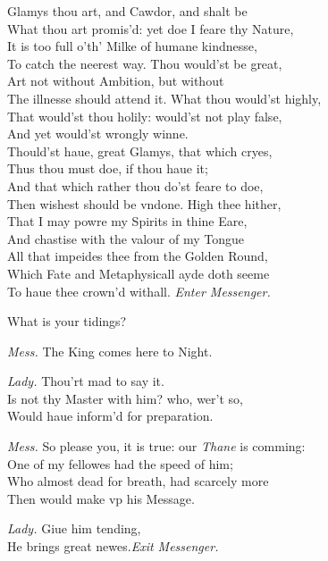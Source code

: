 \documentclass[12pt]{sides}
\newcommand{\clStageDir}[1]{\hspace*{\fill}\textit{#1}\hspace*{\fill}}
\newcommand{\dia}[1]{\hskip 15pt\textit{#1}\hskip 6pt}
\begin{document}
\begin{multicols}{2}
            Glamys thou art, and Cawdor, and shalt be \\ What thou art promis'd: yet doe I feare thy Nature, \\ It is too full o'th' Milke of humane kindnesse, \\ To catch the neerest way. Thou would'st be great, \\ Art not without Ambition, but without \\ The illnesse should attend it. What thou would'st highly, \\ That would'st thou holily: would'st not play false, \\ And yet would'st wrongly winne. \\ Thould'st haue, great Glamys, that which cryes, \\ Thus thou must doe, if thou haue it; \\ And that which rather thou do'st feare to doe, \\ Then wishest should be vndone. High thee hither, \\ That I may powre my Spirits in thine Eare, \\ And chastise with the valour of my Tongue \\ All that impeides thee from the Golden Round, \\ Which Fate and Metaphysicall ayde doth seeme \\ To haue thee crown'd withall. \clStageDir{Enter Messenger.}

            What is your tidings?

            \dia{Mess.} The King comes here to Night.

            \dia{Lady.} Thou'rt mad to say it. \\ Is not thy Master with him? who, wer't so, \\ Would haue inform'd for preparation.

            \dia{Mess.} So please you, it is true: our \textit{Thane} is comming: \\ One of my fellowes had the speed of him; \\ Who almost dead for breath, had scarcely more \\ Then would make vp his Message.

            \dia{Lady.} Giue him tending, \\ He brings great newes.\clStageDir{Exit Messenger.}


\end{multicols}
\end{document}
